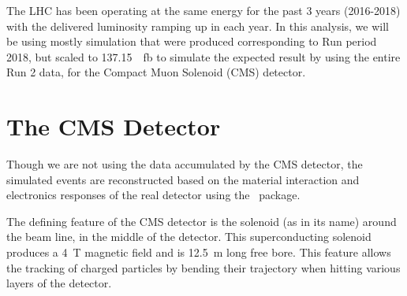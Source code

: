 The LHC has been operating at the same energy for the past 3 years (2016-2018) with 
the delivered luminosity ramping up in each year\cite{luminosity}. In this analysis, we will be using
mostly simulation that were produced corresponding to Run period 2018, but scaled to 
\SI{137.15}{\per\femto\barn} to simulate the expected result by using the entire Run 2 data,
for the Compact Muon Solenoid (CMS) detector.


\section{The CMS Detector}



Though we are not using the data accumulated by the CMS detector, the simulated events are
reconstructed based on the material interaction and electronics responses of the real detector using the
\gf~package\cite{geant4}.

The defining feature of the CMS detector is the solenoid (as in its name) around the beam line, in the
middle of the detector\cite{solenoid_map}.
This superconducting solenoid produces a \SI{4}{\tesla} magnetic field and is 
\SI{12.5}{\meter} long free bore\cite{solenoid_map}. This feature allows the tracking of
charged particles by bending their trajectory when hitting various layers of the detector.


